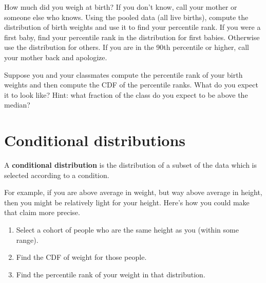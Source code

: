 \documentclass[12pt]{book}
\begin{document}



\begin{exercise}
How much did you weigh at birth?  If you don't know, call your mother
or someone else who knows.  Using the pooled data (all live births),
compute the distribution of birth weights and use it to find your
percentile rank.  If you were a first baby, find your percentile rank
in the distribution for first babies.  Otherwise use the distribution
for others.  If you are in the 90th percentile or higher, call your
mother back and apologize.

\end{exercise}

\begin{exercise}
Suppose you and your classmates compute the percentile rank of your
birth weights and then compute the CDF of the percentile ranks.  What do
you expect it to look like?  Hint: what fraction of the class do you
expect to be above the median?

\end{exercise}


\section{Conditional distributions}

A {\bf conditional distribution} is the distribution of a subset of
the data which is selected according to a condition.

For example, if you are above average in weight, but way above average
in height, then you might be relatively light for your height.  Here's
how you could make that claim more precise.

\begin{enumerate}

\item Select a cohort of people who are the same height as you (within
some range).

\item Find the CDF of weight for those people.

\item Find the percentile rank of your weight in that distribution.

\end{enumerate}
\end{document}
